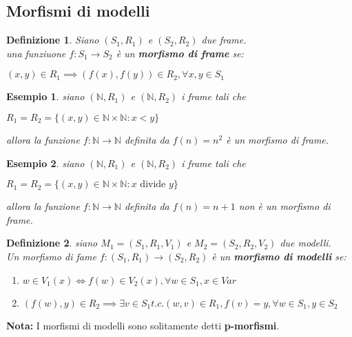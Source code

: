 \documentclass[a4paper,12pt]{article}
\theoremstyle{def}
\newtheorem*{definition}{Definizione}
\theoremstyle{prop}
\theoremstyle{esempio}
\newtheorem*{example}{Esempio}
\theoremstyle{dimostrazione}
\theoremstyle{teo}
\theoremstyle{osservazione}
\begin{document}
\subsection{Morfismi di modelli}
\begin{definition}
	Siano \((S_1, R_1)\) e \((S_2, R_2)\) due frame.\\
	una funziuone \(f : S_1 \rightarrow S_2\) è un \textbf{morfismo di frame} se:
	\begin{center}
		\((x,y)\in R_1 \implies (f(x), f(y)) \in R_2, \forall x,y \in S_1\)
	\end{center}
\end{definition}
\begin{example}
	siano \((\mathbb{N}, R_1)\) e \((\mathbb{N}, R_2)\) i frame tali che
	\begin{center}
		\(R_1 = R_2 = \{(x,y) \in \mathbb{N} \times \mathbb{N} : x < y\}\)
	\end{center}
	allora la funzione \(f : \mathbb{N} \rightarrow \mathbb{N}\) definita da \(f(n) = n^2\) è un morfismo di frame.
\end{example}
\begin{example}
	siano \((\mathbb{N}, R_1)\) e \((\mathbb{N}, R_2)\) i frame tali che
	\begin{center}
		\(R_1 = R_2 = \{(x,y) \in \mathbb{N} \times \mathbb{N} : x \text{ divide } y\}\)\\
	\end{center}
	allora la funzione \(f : \mathbb{N} \rightarrow \mathbb{N}\) definita da \(f(n) = n + 1 \) non è un morfismo di frame.
\end{example}
\begin{definition}
	siano \(M_1 = (S_1, R_1, V_1)\) e \(M_2 = (S_2, R_2, V_2)\) due modelli.\\
	Un morfismo di fame \(f: (S_1, R_1) \rightarrow (S_2, R_2)\) è un \textbf{morfismo di modelli} se:
\end{definition}
\begin{enumerate}
	\item \(w \in V_1(x) \iff f(w) \in V_2(x), \forall w \in S_1, x \in Var\)
	\item \((f(w),y) \in R_2 \implies \exists v \in S_1 t.c. (w,v) \in R_1, f(v) = y, \forall w \in S_1, y \in S_2\)
\end{enumerate}
\textbf{Nota:} I morfismi di modelli sono solitamente detti \textbf{p-morfismi}.\\
\end{document}
